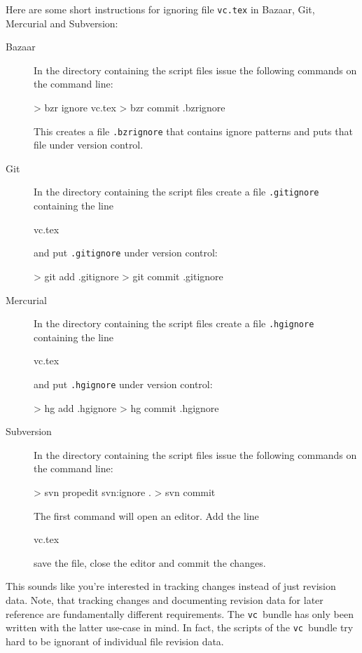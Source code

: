 \documentclass[11pt]{article}
\newcommand*{\pkg}{\texttt{vc}}
\begin{document}
Here are some short instructions for ignoring file \texttt{vc.tex} in
Bazaar, Git, Mercurial and Subversion:
\begin{description}
\item[Bazaar] In the directory containing the script files issue the
  following commands on the command line:
\begin{listing}[style=shell]
> bzr ignore vc.tex
> bzr commit .bzrignore
\end{listing}
This creates a file \texttt{.bzrignore} that contains ignore patterns
and puts that file under version control.

\item[Git] In the directory containing the script files create a file
  \texttt{.gitignore} containing the line
\begin{listing}[style=text]
vc.tex
\end{listing}
and put \texttt{.gitignore} under version control:
\begin{listing}[style=shell]
> git add .gitignore
> git commit .gitignore
\end{listing}

\item[Mercurial] In the directory containing the script files create a file
  \texttt{.hgignore} containing the line
\begin{listing}[style=text]
vc.tex
\end{listing}
and put \texttt{.hgignore} under version control:
\begin{listing}[style=shell]
> hg add .hgignore
> hg commit .hgignore
\end{listing}

\item[Subversion] In the directory containing the script files issue the
  following commands on the command line:
\begin{listing}[style=shell]
> svn propedit svn:ignore .
> svn commit
\end{listing}
The first command will open an editor.  Add the line
\begin{listing}[style=text]
vc.tex
\end{listing}
save the file, close the editor and commit the changes.
\end{description}

 This sounds like you're interested in tracking
changes instead of just revision data.  Note, that tracking changes and
documenting revision data for later reference are fundamentally
different requirements.  The \pkg\ bundle has only been written with the
latter use-case in mind.  In fact, the scripts of the \pkg\ bundle try
hard to be ignorant of individual file revision data.
\end{document}

